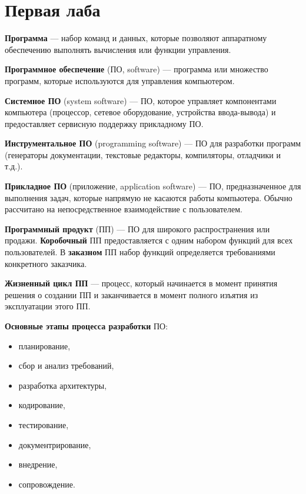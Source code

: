 





\section{Первая лаба}

\textbf{Программа} --- набор команд и данных, которые позволяют аппаратному
обеспечению выполнять вычисления или функции управления.

\textbf{Программное обеспечение} (ПО, software) --- программа или множество
программ, которые используются для управления компьютером.

\textbf{Системное ПО} (system software) --- ПО, которое управляет компонентами
компьютера (процессор, сетевое оборудование, устройства ввода-вывода) и
предоставляет сервисную поддержку прикладному ПО.

\textbf{Инструментальное ПО} (programming software) --- ПО для разработки
программ (генераторы документации, текстовые редакторы, компиляторы, отладчики
и т.д.).

\textbf{Прикладное ПО} (приложение, application software) --- ПО,
предназначенное для выполнения задач, которые напрямую не касаются работы
компьютера. Обычно рассчитано на непосредственное взаимодействие с
пользователем.

\textbf{Программный продукт} (ПП) --- ПО для широкого распространения или
продажи. \textbf{Коробочный} ПП предоставляется с одним набором функций для
всех пользователей. В \textbf{заказном} ПП набор функций определяется
требованиями конкретного заказчика.

\textbf{Жизненный цикл ПП} --- процесс, который начинается в момент принятия
решения о создании ПП и заканчивается в момент полного изъятия из эксплуатации
этого ПП.

\textbf{Основные этапы процесса разработки} ПО:
\begin{itemize}
    \item планирование,
    \item сбор и анализ требований,
    \item разработка архитектуры,
    \item кодирование,
    \item тестирование,
    \item документрирование,
    \item внедрение,
    \item сопровождение.
\end{itemize}

